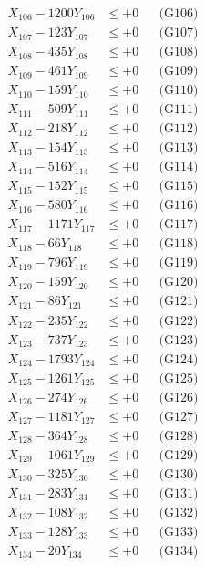 \documentclass[a4paper,10pt]{article}
\begin{document}
{\begin{align}
X_{106} - 1200Y_{106} &\leq +0 && \text{(G106)} \\
X_{107} - 123Y_{107} &\leq +0 && \text{(G107)} \\
X_{108} - 435Y_{108} &\leq +0 && \text{(G108)} \\
X_{109} - 461Y_{109} &\leq +0 && \text{(G109)} \\
X_{110} - 159Y_{110} &\leq +0 && \text{(G110)} \\
\allowbreak
X_{111} - 509Y_{111} &\leq +0 && \text{(G111)} \\
X_{112} - 218Y_{112} &\leq +0 && \text{(G112)} \\
X_{113} - 154Y_{113} &\leq +0 && \text{(G113)} \\
X_{114} - 516Y_{114} &\leq +0 && \text{(G114)} \\
X_{115} - 152Y_{115} &\leq +0 && \text{(G115)} \\
X_{116} - 580Y_{116} &\leq +0 && \text{(G116)} \\
X_{117} - 1171Y_{117} &\leq +0 && \text{(G117)} \\
X_{118} - 66Y_{118} &\leq +0 && \text{(G118)} \\
X_{119} - 796Y_{119} &\leq +0 && \text{(G119)} \\
X_{120} - 159Y_{120} &\leq +0 && \text{(G120)} \\
\allowbreak
X_{121} - 86Y_{121} &\leq +0 && \text{(G121)} \\
X_{122} - 235Y_{122} &\leq +0 && \text{(G122)} \\
X_{123} - 737Y_{123} &\leq +0 && \text{(G123)} \\
X_{124} - 1793Y_{124} &\leq +0 && \text{(G124)} \\
X_{125} - 1261Y_{125} &\leq +0 && \text{(G125)} \\
X_{126} - 274Y_{126} &\leq +0 && \text{(G126)} \\
X_{127} - 1181Y_{127} &\leq +0 && \text{(G127)} \\
X_{128} - 364Y_{128} &\leq +0 && \text{(G128)} \\
X_{129} - 1061Y_{129} &\leq +0 && \text{(G129)} \\
X_{130} - 325Y_{130} &\leq +0 && \text{(G130)} \\
\allowbreak
X_{131} - 283Y_{131} &\leq +0 && \text{(G131)} \\
X_{132} - 108Y_{132} &\leq +0 && \text{(G132)} \\
X_{133} - 128Y_{133} &\leq +0 && \text{(G133)} \\
X_{134} - 20Y_{134} &\leq +0 && \text{(G134)} \\

\end{align}}
\end{document}
